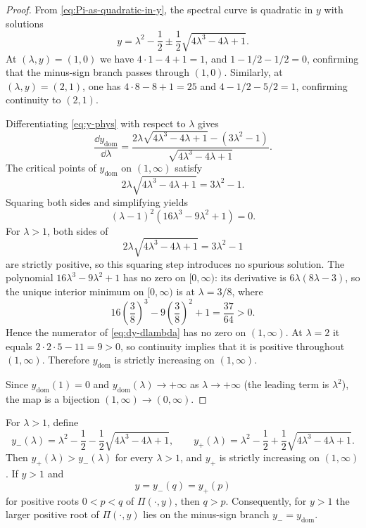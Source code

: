 \begin{proof}
From \eqref{eq:Pi-as-quadratic-in-y}, the spectral curve is quadratic in $y$ with solutions
\[
y = \lambda^2 - \frac{1}{2} \pm \frac{1}{2}\sqrt{4\lambda^3 - 4\lambda + 1}.
\]
At $(\lambda, y) = (1, 0)$ we have $4 \cdot 1 - 4 + 1 = 1$, and $1 - 1/2 - 1/2 = 0$, confirming that the minus-sign branch passes through $(1, 0)$.
Similarly, at $(\lambda, y) = (2, 1)$, one has $4 \cdot 8 - 8 + 1 = 25$ and $4 - 1/2 - 5/2 = 1$, confirming continuity to $(2, 1)$.

Differentiating \eqref{eq:y-phys} with respect to $\lambda$ gives
\begin{equation}\label{eq:dy-dlambda}
\frac{\dd y_{\mathrm{dom}}}{\dd\lambda}
= \frac{2\lambda\sqrt{4\lambda^3 - 4\lambda + 1} - (3\lambda^2 - 1)}
{\sqrt{4\lambda^3 - 4\lambda + 1}}.
\end{equation}
The critical points of $y_{\mathrm{dom}}$ on $(1, \infty)$ satisfy
\[
2\lambda\sqrt{4\lambda^3 - 4\lambda + 1} = 3\lambda^2 - 1.
\]
Squaring both sides and simplifying yields
\[
(\lambda - 1)^2(16\lambda^3 - 9\lambda^2 + 1) = 0.
\]
For $\lambda > 1$, both sides of
\[
2\lambda\sqrt{4\lambda^3 - 4\lambda + 1} = 3\lambda^2 - 1
\]
are strictly positive, so this squaring step introduces no spurious solution.
The polynomial $16\lambda^3 - 9\lambda^2 + 1$ has no zero on $[0, \infty)$: its derivative is $6\lambda(8\lambda - 3)$, so the unique interior minimum on $[0, \infty)$ is at $\lambda = 3/8$, where
\[
16\left(\frac{3}{8}\right)^3 - 9\left(\frac{3}{8}\right)^2 + 1 = \frac{37}{64} > 0.
\]
Hence the numerator of \eqref{eq:dy-dlambda} has no zero on $(1, \infty)$.
At $\lambda = 2$ it equals $2 \cdot 2 \cdot 5 - 11 = 9 > 0$, so continuity implies that it is positive throughout $(1,\infty)$.
Therefore $y_{\mathrm{dom}}$ is strictly increasing on $(1, \infty)$.

Since $y_{\mathrm{dom}}(1) = 0$ and $y_{\mathrm{dom}}(\lambda) \to +\infty$ as $\lambda \to +\infty$ (the leading term is $\lambda^2$), the map is a bijection $(1, \infty) \to (0, \infty)$.
\end{proof}

\begin{lemma}\label{lem:ygt1-sheet-comparison}
For \(\lambda>1\), define
\[
y_-(\lambda)=\lambda^2-\frac12-\frac12\sqrt{4\lambda^3-4\lambda+1},
\qquad
y_+(\lambda)=\lambda^2-\frac12+\frac12\sqrt{4\lambda^3-4\lambda+1}.
\]
Then \(y_+(\lambda)>y_-(\lambda)\) for every \(\lambda>1\), and \(y_+\) is strictly increasing on \((1,\infty)\).
If \(y>1\) and
\[
y=y_-(q)=y_+(p)
\]
for positive roots \(0<p<q\) of \(\Pi(\cdot,y)\), then \(q>p\).
Consequently, for \(y>1\) the larger positive root of \(\Pi(\cdot,y)\) lies on the minus-sign branch \(y_-=y_{\mathrm{dom}}\).
\end{lemma}

